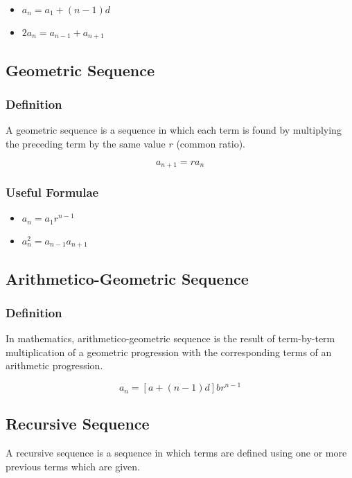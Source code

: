 \documentclass{article}
\begin{document}
\begin{itemize}
    \item $a_{n}=a_1+(n-1)d$
    \item $2a_{n}=a_{n-1}+a_{n+1}$
\end{itemize}

\subsection{Geometric Sequence}

\subsubsection{Definition}

A geometric sequence is a sequence in which each term is found by multiplying the preceding term by the same value $r$ (common ratio).

$$a_{n+1}=r a_{n}$$

\subsubsection{Useful Formulae}

\begin{itemize}
    \item $a_{n}=a_1r^{n-1}$
    \item $a_{n}^2=a_{n-1}a_{n+1}$
\end{itemize}

\subsection{Arithmetico-Geometric Sequence}

\subsubsection{Definition}

In mathematics, arithmetico-geometric sequence is the result of term-by-term multiplication of a geometric progression with the corresponding terms of an arithmetic progression. 

$$a_n=[a+(n-1)d]br^{n-1}$$

\subsection{Recursive Sequence}
A recursive sequence is a sequence in which terms are defined using one or more previous terms which are given.
\end{document}
